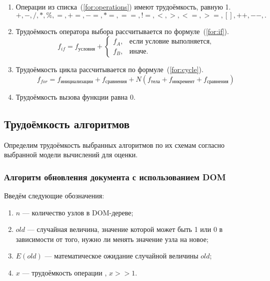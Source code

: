 \begin{enumerate}[label=\arabic*)]
	\item Операции из списка~(\ref{for:operations}) имеют трудоёмкость, равную 1.
	\begin{equation}
		\label{for:operations}
		+, -, /, *, \%, =, +=, -=, *=, ==, !=, <, >, <=, >=, [], ++, {-}-, . 
	\end{equation}
	\item Трудоёмкость оператора выбора  рассчитывается по формуле~(\ref{for:if}).
	\begin{equation}
		\label{for:if}
		f_{if} = f_{\text{условия}} +
		\begin{cases}
			f_A, & \text{если условие выполняется,}\\
			f_B, & \text{иначе.}
		\end{cases}
	\end{equation}
	\item Трудоёмкость цикла рассчитывается по формуле~(\ref{for:cycle}).
	\begin{equation}
		\label{for:cycle}
		f_{for} = f_{\text{инициализации}} + f_{\text{сравнения}} + N(f_{\text{тела}} + f_{\text{инкремент}} + f_{\text{сравнения}})
	\end{equation}
	\item Трудоёмкость вызова функции равна 0.
\end{enumerate}


\subsection{Трудоёмкость алгоритмов}

Определим трудоёмкость выбранных алгоритмов по их схемам согласно выбранной модели вычислений для оценки.

\subsubsection{Алгоритм обновления документа с использованием DOM}

Введём следующие обозначения:
\begin{enumerate}[label=\arabic*)]
	\item $n$ --- количество узлов в DOM-дереве;
	\item $old$ --- случайная величина, значение которой может быть 1 или 0 в зависимости от того, нужно ли менять значение узла на новое;
	\item $E(old)$ --- математическое ожидание случайной величины $old$;
	\item $x$ --- трудоёмкость операции , $x >> 1$.
\end{enumerate}

